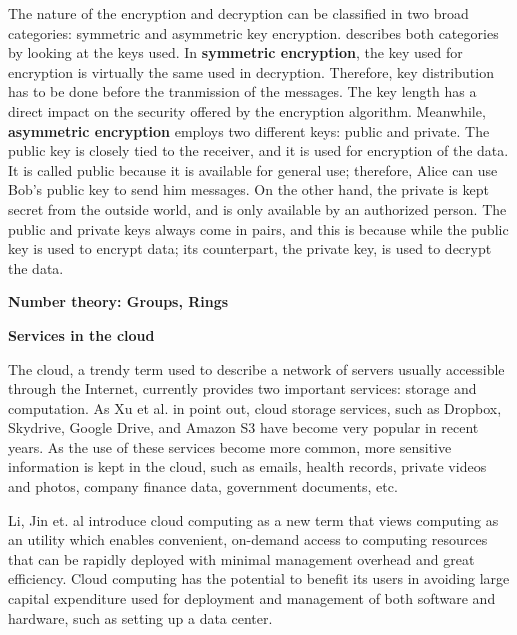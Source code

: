 The nature of the encryption and decryption can be classified in two broad categories: symmetric and asymmetric key encryption. \cite{CryptoKeys} describes both categories by looking at the keys used. In \textbf{symmetric encryption}, the key used for encryption is virtually the same used in decryption. Therefore, key distribution has to be done before the tranmission of the messages. The key length has a direct impact on the security offered by the encryption algorithm. Meanwhile, \textbf{asymmetric encryption} employs two different keys: public and private. The public key is closely tied to the receiver, and it is used for encryption of the data. It is called public because it is available for general use; therefore, Alice can use Bob's public key to send him messages. On the other hand, the private is kept secret from the outside world, and is only available by an authorized person. The public and private keys always come in pairs, and this is because while the public key is used to encrypt data; its counterpart, the private key, is used to decrypt the data. 

\textbf{Number theory: Groups, Rings}


\textbf{Services in the cloud}

The cloud, a trendy term used to describe a network of servers usually accessible through the Internet, currently provides two important services: storage and computation. As Xu et al. in \cite{cryptoeprint:2011:574} point out, cloud storage services, such as Dropbox, Skydrive, Google Drive, and Amazon S3 have become very popular in recent years. As the use of these services become more common, more sensitive information is kept in the cloud, such as emails, health records, private videos and photos, company finance data, government documents, etc. 

Li, Jin et. al \cite{cryptoeprint:2009:593} introduce cloud computing as a new term that views computing as an utility which enables convenient, on-demand access to computing resources that can be rapidly deployed with minimal management overhead and great efficiency. Cloud computing has the potential to benefit its users in avoiding large capital expenditure used for deployment and management of both software and hardware, such as setting up a data center. 

